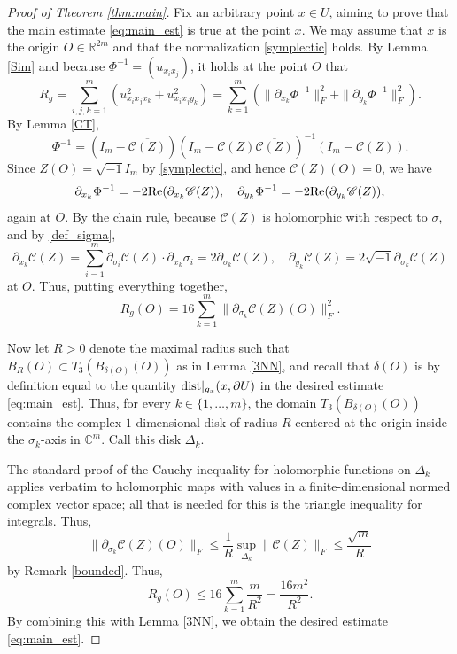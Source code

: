 \documentclass[11pt,reqno]{amsart}
\renewcommand{\leq}{\leqslant}
\theoremstyle{plain}
\theoremstyle{definition}
\numberwithin{equation}{section}
\begin{document}
\begin{proof}[Proof of Theorem \ref{thm:main}]
Fix an arbitrary point $x \in U$, aiming to prove that the main estimate \eqref{eq:main_est} is true at the point $x$. We may assume that $x$ is the origin $O \in \mathbb{R}^{2m}$ and that the normalization \eqref{symplectic} holds. By Lemma \ref{Sim} and because $\Phi^{-1} = (u_{x_ix_j})$, it holds at the point $O$ that
$$R_g=\sum_{i,j,k=1}^{m} (u_{x_{i}x_{j}x_{k}}^{2}+u_{x_{i}x_{j}y_{k}}^{2}) = \sum_{k=1}^{m} (\|\partial_{x_k}\Phi^{-1}\|_F^2 + \|\partial_{y_k}\Phi^{-1}\|_F^2).$$
By Lemma \ref{CT},
$$\Phi^{-1}=(I_{m}-\overline{\mathscr{C}(Z)})(I_{m}-\mathscr{C}(Z)\overline{\mathscr{C}(Z)})^{-1}(I_{m}-\mathscr{C}(Z)).$$
Since $Z(O) = \sqrt{-1}I_m$ by \eqref{symplectic}, and hence $\mathscr{C}(Z)(O) = 0$, we have 
$$\partial_{x_k}\Phi^{-1} = -2{\rm Re}(\partial_{x_k}\mathscr{C}(Z)),\quad  \partial_{y_k}\Phi^{-1} = -2{\rm Re}(\partial_{y_k} \mathscr{C}(Z)),$$
again at $O$. By the chain rule, because $\mathscr{C}(Z)$ is holomorphic with respect to $\sigma$, and by \eqref{def_sigma},
$$\partial_{x_k}\mathscr{C}(Z) = \sum_{i=1}^m \partial_{\sigma_i}\mathscr{C}(Z) \cdot \partial_{x_k}\sigma_i = 2\partial_{\sigma_k}\mathscr{C}(Z),\quad  \partial_{y_k}\mathscr{C}(Z) = 2\sqrt{-1}\partial_{\sigma_k}\mathscr{C}(Z)$$
at $O$. Thus, putting everything together,
\begin{equation}\label{f''}
    R_g(O)= 16 \sum_{k=1}^m \|\partial_{\sigma_k}\mathscr{C}(Z)(O)\|_F^2.
\end{equation}

Now let $R > 0$ denote the maximal radius such that $B_R(O)\subset T_{3}(B_{\delta(O)}(O))$ as in Lemma \ref{3NN}, and recall that $\delta(O)$ is by definition equal to the quantity ${\rm dist}|_{g_x}(x,\partial U)$ in the desired estimate \eqref{eq:main_est}.
Thus, for every $k \in \{1,\ldots,m\}$, the domain $T_3(B_{\delta(O)}(O))$ contains the complex $1$-dimensional disk of radius $R$ centered at the origin inside the $\sigma_k$-axis in $\mathbb{C}^m$. Call this disk $\Delta_{k}$.

The standard proof of the Cauchy inequality for holomorphic functions on $\Delta_k$ applies verbatim to holomorphic maps with values in a finite-dimensional normed complex vector space; all that is needed for this is the triangle inequality for integrals. Thus,
$$\|\partial_{\sigma_k} \mathscr{C}(Z)(O)\|_F \leq \frac{1}{R}\sup_{\Delta_k} \|\mathscr{C}(Z)\|_F \leq \frac{\sqrt{m}}{R}$$
by Remark \ref{bounded}. Thus,
$$R_g(O)\leq 16 \sum_{k=1}^{m}\frac{m}{R^2}=\frac{16m^2}{R^2}.$$
By combining this with Lemma \ref{3NN}, we obtain the desired estimate \eqref{eq:main_est}.
\end{proof}
\end{document}
